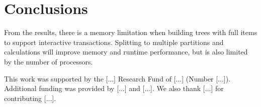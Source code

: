 \documentclass[sigconf, nonacm]{acmart}
\begin{document}
\section{Conclusions}
From the results, there is a memory limitation when building trees with full items to support interactive transactions. Splitting to multiple partitions and calculations will improve memory and runtime performance, but is also limited by the number of processors.


\begin{acks}
 This work was supported by the [...] Research Fund of [...] (Number [...]). Additional funding was provided by [...] and [...]. We also thank [...] for contributing [...].
\end{acks}




\end{document}
